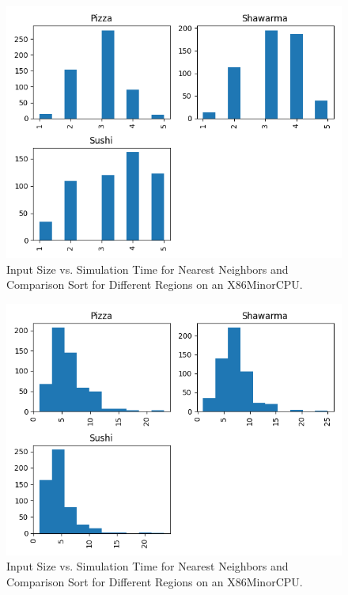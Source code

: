 \begin{figure}[t!]
    \centerline{\includegraphics[width=\columnwidth]{data/histogram_Q1}}
    \caption{Input Size vs. Simulation Time for Nearest Neighbors and Comparison Sort for Different Regions on an X86MinorCPU.}
    \label{f:instruction_time}
\end{figure}

\begin{figure}[t!]
    \centerline{\includegraphics[width=\columnwidth]{data/histogram_Q2.png}}
    \caption{Input Size vs. Simulation Time for Nearest Neighbors and Comparison Sort for Different Regions on an X86MinorCPU.}
    \label{f:instruction_time}
\end{figure}

